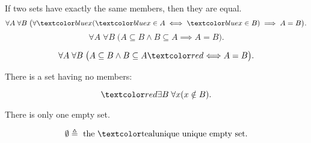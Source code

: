 
\begin{frame}{}
  \begin{axiom}
    If two sets have exactly the same members, then they are equal.
    \[
      \forall A\; \forall B\; \big(\forall  \blue{x} (\blue{x} \in A \iff \blue{x} \in B) \implies A = B \big).
    \]
    \[
      \forall A\; \forall B\; \big(A \subseteq B \land B \subseteq A \implies A = B \big).
    \]
  \end{axiom}

  \pause
  \vspace{0.30cm}
  \[
    \forall A\; \forall B\; \big(A \subseteq B \land B \subseteq A \red{\iff} A = B \big).
  \]
\end{frame}

\begin{frame}{}
  \begin{axiom}
    There is a set having no members:

    \[
      \red{\exists B}\; \forall x (x \notin B).
    \]
  \end{axiom}

  \pause
  \vspace{0.50cm}
  \begin{theorem}
    There is only one empty set.
  \end{theorem}

  \pause
  \vspace{0.50cm}
  \begin{definition}[``$\emptyset$'']
    \[
      \emptyset \triangleq \text{ the \teal{unique} unique empty set}.
    \]
  \end{definition}
\end{frame}
